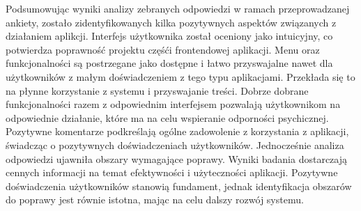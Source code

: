 Podsumowując wyniki analizy zebranych odpowiedzi w ramach przeprowadzanej ankiety, zostało zidentyfikowanych kilka pozytywnych aspektów związanych z działaniem aplikcji. Interfejs użytkownika został oceniony jako intuicyjny, co potwierdza poprawność projektu częśći frontendowej aplikacji. Menu oraz funkcjonalności są postrzegane jako dostępne i łatwo przyswajalne nawet dla użytkowników z małym doświadczeniem z tego typu aplikacjami. Przekłada się to na płynne korzystanie z systemu i przyswajanie treści. Dobrze dobrane funkcjonalności razem z odpowiednim interfejsem pozwalają użytkownikom na odpowiednie działanie, które ma na celu wspieranie odporności psychicznej.  Pozytywne komentarze podkreślają ogólne zadowolenie z korzystania z aplikacji, świadcząc o pozytywnych doświadczeniach użytkowników. Jednocześnie analiza odpowiedzi ujawniła obszary wymagające poprawy. Wyniki badania dostarczają cennych informacji na temat efektywności i użyteczności aplikacji. Pozytywne doświadczenia użytkowników stanowią fundament, jednak identyfikacja obszarów do poprawy jest równie istotna, mając na celu dalszy rozwój systemu.


